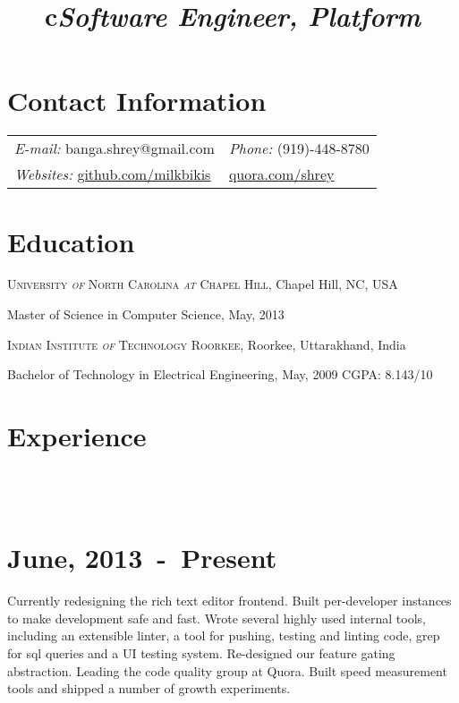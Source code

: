 \documentclass[margin,line]{res}
\newcommand{\datesection}[1]{\section{\textnormal{\scriptsize \textcolor{subtle}{#1}}}}
\newenvironment{list1}{
  \begin{list}{\ding{113}}{%
      \setlength{\itemsep}{0in}
      \setlength{\parsep}{0in} \setlength{\parskip}{0in}
      \setlength{\topsep}{0in} \setlength{\partopsep}{0in} 
      \setlength{\leftmargin}{0.17in}}}{\end{list}}
\begin{document}

\begin{resume}
\section{\sc Contact Information}
\vspace{.05in}
\begin{tabular}{@{}p{4in}p{4in}}
{\it E-mail:}  banga.shrey@gmail.com  & {\it Phone:}  (919)-448-8780 \\            
{\it Websites:} \url{github.com/milkbikis} & \url{quora.com/shrey} \\
\end{tabular}

\section{\sc Education}
\textsc{University \textit{of} North Carolina \textit{at} Chapel Hill}, Chapel Hill, NC, USA\\
\vspace*{-.1in}
\begin{list1}
\item[] Master of Science in Computer Science, May, 2013
\end{list1}

\textsc{Indian Institute \textit{of} Technology Roorkee}, Roorkee, Uttarakhand, India\\
\vspace*{-.1in}
\begin{list1}
\item[] Bachelor of Technology in Electrical Engineering, May, 2009 \hfill {CGPA: 8.143/10}
\end{list1}

\section{\sc Experience}

\begin{format}
		\title{c}\\
		\body\\
\end{format}

\datesection{June, 2013~-~Present}
\title{\em Software Engineer, Platform}
\begin{position}
Currently redesigning the rich text editor frontend.
Built per-developer instances to make development safe and fast.
Wrote several highly used internal tools, including an extensible linter, a tool for pushing, testing and linting code, grep for sql queries and a UI testing system.
Re-designed our feature gating abstraction.
Leading the code quality group at Quora.
Built speed measurement tools and shipped a number of growth experiments.
\end{position}


\end{resume}
\end{document}
